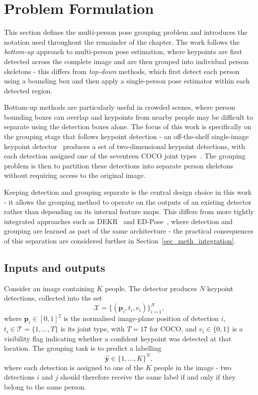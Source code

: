 \section{Problem Formulation}
\label{sec_meth_problem}

This section defines the multi-person pose grouping problem
and introduces the notation used throughout the remainder of the chapter.
The work follows the \emph{bottom-up} approach to multi-person pose estimation,
where keypoints are first detected across the complete image
and are then grouped into individual person skeletons -
this differs from \emph{top-down} methods,
which first detect each person using a bounding box
and then apply a single-person pose estimator within each detected region.

Bottom-up methods are particularly useful in crowded scenes,
where person bounding boxes can overlap
and keypoints from nearby people may be difficult to separate using the detection boxes alone.
The focus of this work is specifically on the grouping stage that follows keypoint detection -
an off-the-shelf single-image keypoint detector~\cite{cheng2020higherhrnet}
produces a set of two-dimensional keypoint detections,
with each detection assigned one of the seventeen COCO joint types~\cite{lin2014coco}.
The grouping problem is then to partition these detections into separate person skeletons
without requiring access to the original image.

Keeping detection and grouping separate is the central design choice in this work -
it allows the grouping method to operate on the outputs of an existing detector
rather than depending on its internal feature maps.
This differs from more tightly integrated approaches
such as DEKR~\cite{geng2021dekr} and ED-Pose~\cite{yang2023edpose},
where detection and grouping are learned as part of the same architecture -
the practical consequences of this separation are considered further in Section~\ref{sec_meth_integration}.

\subsection{Inputs and outputs}
\label{sec_meth_problem_io}

Consider an image containing $K$ people.
The detector produces $N$ keypoint detections, collected into the set
\begin{equation}
    \mathcal{X}
    = \bigl\{(\mathbf{p}_i, t_i, v_i)\bigr\}_{i=1}^{N},
\end{equation}
where $\mathbf{p}_i \in [0,1]^2$ is the normalised image-plane position of detection $i$,
$t_i \in \mathcal{T} = \{1,\dots,T\}$ is its joint type,
with $T=17$ for COCO,
and $v_i \in \{0,1\}$ is a visibility flag
indicating whether a confident keypoint was detected at that location.
The grouping task is to predict a labelling
\begin{equation}
    \hat{\mathbf{y}} \in \{1,\dots,K\}^{N},
\end{equation}
where each detection is assigned to one of the $K$ people in the image -
two detections $i$ and $j$ should therefore receive the same label
if and only if they belong to the same person.

